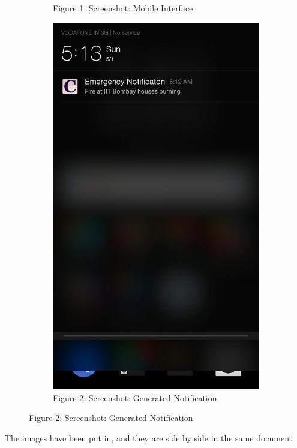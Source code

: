 \documentclass[12pt]{article}
\begin{document}
\begin{figure}[H]
\begin{subfigure}[t]{0.37\textwidth}
    \caption*{Figure 1: Screenshot: Mobile Interface}
    \label{fig:1}
  \end{subfigure}
  \hspace{2mm}
  \begin{subfigure}[t]{0.37\textwidth}
    \includegraphics[width=\textwidth]{2}
    \caption*{Figure 2: Screenshot: Generated Notification}
    \label{fig:2}
  \end{subfigure}
\end{figure}
The images have been put in, and they are side by side in the same document
\end{document}
